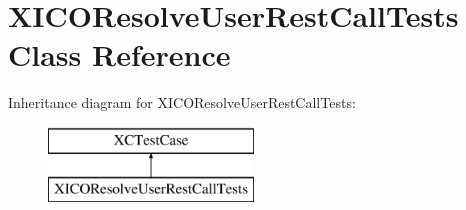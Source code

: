 \hypertarget{interface_x_i_c_o_resolve_user_rest_call_tests}{}\section{X\+I\+C\+O\+Resolve\+User\+Rest\+Call\+Tests Class Reference}
\label{interface_x_i_c_o_resolve_user_rest_call_tests}
Inheritance diagram for X\+I\+C\+O\+Resolve\+User\+Rest\+Call\+Tests\+:\begin{figure}[H]
\begin{center}
\leavevmode
\includegraphics[height=2.000000cm]{interface_x_i_c_o_resolve_user_rest_call_tests}
\end{center}
\end{figure}
